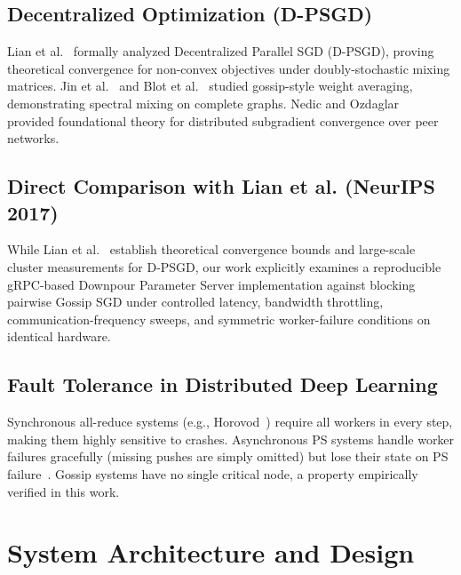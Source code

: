 \documentclass[conference]{IEEEtran}
\begin{document}
\subsection{Decentralized Optimization (D-PSGD)}
Lian et al.~\cite{lian2017can} formally analyzed Decentralized Parallel SGD (D-PSGD), proving theoretical convergence for non-convex objectives under doubly-stochastic mixing matrices. Jin et al.~\cite{jin2016scale} and Blot et al.~\cite{blot2016gossip} studied gossip-style weight averaging, demonstrating spectral mixing on complete graphs. Nedic and Ozdaglar~\cite{nedic2009distributed} provided foundational theory for distributed subgradient convergence over peer networks.

\subsection{Direct Comparison with Lian et al. (NeurIPS 2017)}
While Lian et al.~\cite{lian2017can} establish theoretical convergence bounds and large-scale cluster measurements for D-PSGD, our work explicitly examines a reproducible gRPC-based Downpour Parameter Server implementation against blocking pairwise Gossip SGD under controlled latency, bandwidth throttling, communication-frequency sweeps, and symmetric worker-failure conditions on identical hardware.

\subsection{Fault Tolerance in Distributed Deep Learning}
Synchronous all-reduce systems (e.g., Horovod~\cite{sergeev2018horovod}) require all workers in every step, making them highly sensitive to crashes. Asynchronous PS systems handle worker failures gracefully (missing pushes are simply omitted) but lose their state on PS failure~\cite{ho2013more}. Gossip systems have no single critical node, a property empirically verified in this work.

\section{System Architecture and Design}
\end{document}
